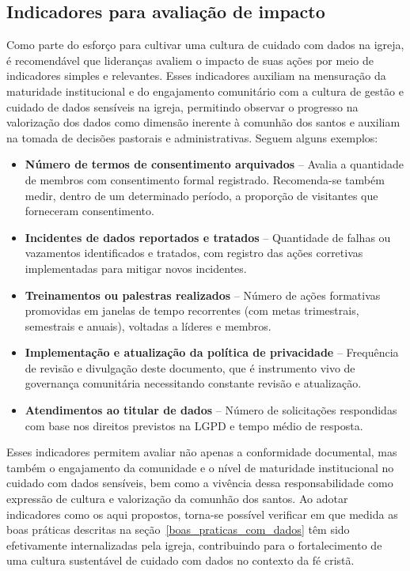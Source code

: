 \subsection{Indicadores para avaliação de impacto}

Como parte do esforço para cultivar uma cultura de cuidado com dados na igreja, é recomendável que lideranças avaliem o impacto de suas ações por meio de indicadores simples e relevantes. Esses indicadores auxiliam na mensuração da maturidade institucional e do engajamento comunitário com a cultura de gestão e cuidado de dados sensíveis na igreja, permitindo observar o progresso na valorização dos dados como dimensão inerente à comunhão dos santos e auxiliam na tomada de decisões pastorais e administrativas. Seguem alguns exemplos:

\begin{itemize}
    \item \textbf{Número de termos de consentimento arquivados} – Avalia a quantidade de membros com consentimento formal registrado. Recomenda-se também medir, dentro de um determinado período, a proporção de visitantes que forneceram consentimento.
    \item \textbf{Incidentes de dados reportados e tratados} – Quantidade de falhas ou vazamentos identificados e tratados, com registro das ações corretivas implementadas para mitigar novos incidentes.
    \item \textbf{Treinamentos ou palestras realizados} – Número de ações formativas promovidas em janelas de tempo recorrentes (com metas trimestrais, semestrais e anuais), voltadas a líderes e membros.
    \item \textbf{Implementação e atualização da política de privacidade} – Frequência de revisão e divulgação deste documento, que é instrumento vivo de governança comunitária necessitando constante revisão e atualização.
    \item \textbf{Atendimentos ao titular de dados} – Número de solicitações respondidas com base nos direitos previstos na LGPD e tempo médio de resposta.
\end{itemize}

Esses indicadores permitem avaliar não apenas a conformidade documental, mas também o engajamento da comunidade e o nível de maturidade institucional no cuidado com dados sensíveis, bem como a vivência dessa responsabilidade como expressão de cultura e valorização da comunhão dos santos. Ao adotar indicadores como os aqui propostos, torna-se possível verificar em que medida as boas práticas descritas na seção~\ref{boas_praticas_com_dados} têm sido efetivamente internalizadas pela igreja, contribuindo para o fortalecimento de uma cultura sustentável de cuidado com dados no contexto da fé cristã.

